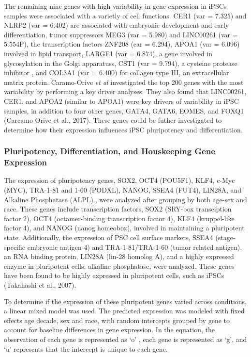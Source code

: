 \documentclass[
  letterpaper,
  DIV=11,
  numbers=noendperiod]{scrartcl}
\begin{document}
The remaining nine genes with high variability in gene expression in
iPSCs samples were associated with a varietly of cell functions. CER1
(var = 7.325) and NLRP2 (var = 6.402) are associated with embryonic
development and early differentiation, tumor suppressors MEG3 (var =
5.980) and LINC00261 (var = 5.554P), the transcription factors ZNF208
(car = 6.294), APOA1 (var = 6.096) involved in lipid transport, LARGE1
(var = 6.874), a gene involved in glycosylation in the Golgi apparatuss,
CST1 (var = 9.794), a cysteine protease inhibitor , and COL3A1 (var =
6.400) for collagen type III, an extracellular matrix protein.
Caramo-Orive \emph{et al} investigated the top 200 genes with the most
variability by performing a key driver analyses. They also found that
LINC00261, CER1, and APOA2 (similar to APOA1) were key drivers of
variability in iPSC samples, in addition to four other genes, GATA4,
GATA6, EOMES, and FOXQ1 (Carcamo-Orive et al., 2017). These genes could
be futher investigated to determine how their expression influences iPSC
pluripotency and differentiation.

\subsubsection{Pluripotency, Differentiation, and Houskeeping Gene
Expression}\label{pluripotency-differentiation-and-houskeeping-gene-expression}

The expression of pluripotency genes, SOX2, OCT4 (POU5F1), KLF4, c-Myc
(MYC), TRA-1-81 and 1-60 (PODXL), NANOG, SSEA4 (FUT4), LIN28A, and
Alkaline Phosphatase (ALPL)., were analyzed after grouping by both
age-sex and race. These genes include transcription factors, SOX2
(SRY-box transciption factor 2), OCT4 (octamer-binding transcription
factor 4), KLF4 (kruppel-like factor 4), and NANOG (nanog homeobox),
involved in maintaining a pluripotent state. Additionally, the
expression of PSC cell surface markers, SSEA4 (stage-specific embryonic
antigen-4) and TRA-1-81/TRA-1-60 (tumor related antigen), an RNA binding
protein, LIN28A (lin-28 homolog A), and a highly expressed enzyme in
pluripotent cells, alkaline phosphatase, were analyzed. These genes have
been found to be highly expressed in pluripotent cells, such as iPSCs
(Takahashi et al., 2007).

To determine if the expression of these pluripotent genes varied across
conditions, a linear mixed model was used. The predicted expression was
modeled with fixed effects age decade, sex and race, with random
intercepts grouped by gene to account for baseline differences in gene
expression. In the equation, the observation of each gene is represented
as `o' , each gene is represented as `g', and `u' represents that the
intercept is unique to each gene.
\end{document}
